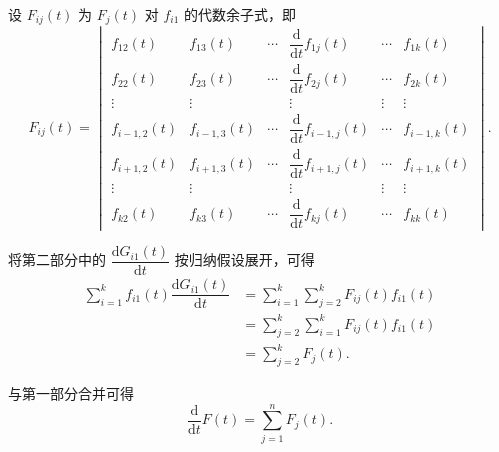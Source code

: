 \begin{exercise}
\begin{exgroup}
\begin{answer}
            设 $F_{ij}(t)$ 为 $F_j(t)$ 对 $f_{i1}$ 的代数余子式，即
            \[
                F_{ij}(t) = \begin{vmatrix}
                    f_{12}(t) & f_{13}(t) & \cdots & \dfrac{\mathrm{d}}{\mathrm{d}t}f_{1j}(t) & \cdots & f_{1k}(t) \\[2ex]
                    f_{22}(t) & f_{23}(t) & \cdots & \dfrac{\mathrm{d}}{\mathrm{d}t}f_{2j}(t) & \cdots & f_{2k}(t) \\[2ex]
                    \vdots    & \vdots    &        & \vdots                                   & \vdots & \vdots    \\[2ex]
                    f_{i-1,2}(t) & f_{i-1,3}(t) & \cdots & \dfrac{\mathrm{d}}{\mathrm{d}t}f_{i-1,j}(t) & \cdots & f_{i-1,k}(t) \\[2ex]
                    f_{i+1,2}(t) & f_{i+1,3}(t) & \cdots & \dfrac{\mathrm{d}}{\mathrm{d}t}f_{i+1,j}(t) & \cdots & f_{i+1,k}(t) \\[2ex]
                    \vdots    & \vdots    &        & \vdots                                   & \vdots & \vdots    \\[2ex]
                    f_{k2}(t) & f_{k3}(t) & \cdots & \dfrac{\mathrm{d}}{\mathrm{d}t}f_{kj}(t) & \cdots & f_{kk}(t)
                \end{vmatrix}.
            \]

            将第二部分中的 $\dfrac{\mathrm{d}G_{i1}(t)}{\mathrm{d}t}$ 按归纳假设展开，可得
            \begin{align*}
                \sum_{i=1}^k f_{i1}(t) \dfrac{\mathrm{d}G_{i1}(t)}{\mathrm{d}t}
                &= \sum_{i=1}^k \sum_{j=2}^k F_{ij}(t) f_{i1}(t) \\
                &= \sum_{j=2}^k \sum_{i=1}^k F_{ij}(t) f_{i1}(t) \\
                &= \sum_{j=2}^k F_j(t).
            \end{align*}

            与第一部分合并可得
            \[
                \dfrac{\mathrm{d}}{\mathrm{d}t}F(t)=\sum\limits_{j=1}^nF_j(t).
            \]

        \end{answer}


\end{exgroup}
\end{exercise}
